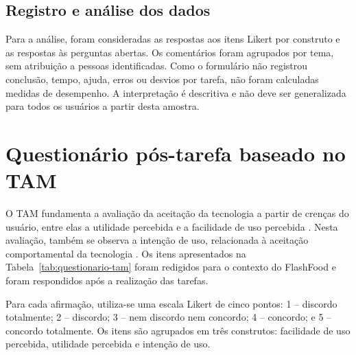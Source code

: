 \subsection{Registro e análise dos dados}

Para a análise, foram consideradas as respostas aos itens Likert por construto e as respostas às perguntas abertas. Os comentários foram agrupados por tema, sem atribuição a pessoas identificadas. Como o formulário não registrou conclusão, tempo, ajuda, erros ou desvios por tarefa, não foram calculadas medidas de desempenho. A interpretação é descritiva e não deve ser generalizada para todos os usuários a partir desta amostra.

\section{Questionário pós-tarefa baseado no TAM}

O TAM fundamenta a avaliação da aceitação da tecnologia a partir de crenças do usuário, entre elas a utilidade percebida e a facilidade de uso percebida \cite{Davis1989TAM}. Nesta avaliação, também se observa a intenção de uso, relacionada à aceitação comportamental da tecnologia \cite{DavisBagozziWarshaw1989}. Os itens apresentados na Tabela~\ref{tab:questionario-tam} foram redigidos para o contexto do FlashFood e foram respondidos após a realização das tarefas.

Para cada afirmação, utiliza-se uma escala Likert de cinco pontos: 1 -- discordo totalmente; 2 -- discordo; 3 -- nem discordo nem concordo; 4 -- concordo; e 5 -- concordo totalmente. Os itens são agrupados em três construtos: facilidade de uso percebida, utilidade percebida e intenção de uso.

